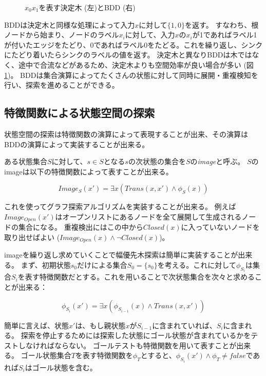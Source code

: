 \begin{figure}
  \centering
  \begin{tikzpicture}[scale=0.6]
    
  \end{tikzpicture}
  \caption{$x_0 x_1$を表す決定木 (左)とBDD (右)}
  \label{fig:bdd}
\end{figure}

BDDは決定木と同様な処理によって入力$x$に対して$\{1, 0\}$を返す。
すなわち、根ノードから始まり、ノードのラベル$x_i$に対して、入力$x$の$x_i$が1であればラベル1が付いたエッジをたどり、0であればラベル0をたどる。これを繰り返し、シンクにたどり着いたらシンクのラベルの値を返す。
決定木と異なりBDDは木ではなく、途中で合流などがあるため、決定木よりも空間効率が良い場合が多い (図\ref{fig:bdd})。
BDDは集合演算によってたくさんの状態に対して同時に展開・重複検知を行い、探索を進めることができる。



\subsection{特徴関数による状態空間の探索}

状態空間の探索は特徴関数の演算によって表現することが出来、その演算はBDDの演算によって実装することが出来る。

ある状態集合$S$に対して、$s \in S$となる$s$の次状態の集合を$S$の{\it image}と呼ぶ。
$S$のimageは以下の特徴関数によって表すことが出来る。

\begin{equation}
	Image_S(x') = \exists x (Trans(x,x') \land \phi_S(x))
\end{equation}

これを使ってグラフ探索アルゴリズムを実装することが出来る。
例えば$Image_{Open}(x')$はオープンリストにあるノードを全て展開して生成されるノードの集合になる。
重複検出にはこの中から$Closed(x)$に入っていないノードを取り出せばよい ($Image_{Open}(x) \land \lnot Closed(x)$)。


imageを繰り返し求めていくことで幅優先木探索は簡単に実装することが出来る。
まず、初期状態$s_0$だけによる集合$S_0 = \{s_0\}$を考える。これに対して$\phi_{S_{i}}$は集合$S_i$を表す特徴関数だとする。これを用いることで次状態集合を次々と求めることが出来る：

\begin{equation}
	\phi_{S_i}(x') = \exists x (\phi_{S_{i-1}}(x) \land Trans(x,x'))
\end{equation}

簡単に言えば、状態$x'$は、もし親状態$x$が$S_{i-1}$に含まれていれば、$S_i$に含まれる。
探索を停止するためには探索した状態にゴール状態が含まれているかをテストしなければならない。
ゴールテストも特徴関数を用いて表すことが出来る。
ゴール状態集合$T$を表す特徴関数を$\phi_T$とすると、$\phi_{S_i}(x') \land \phi_T \neq false$であれば$S_i$はゴール状態を含む。

